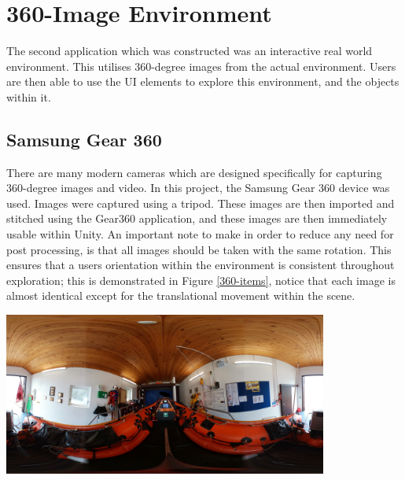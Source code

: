 \documentclass[ %
                    author={Elis Jones},
                supervisor={Dr. Kirsten Cater},
                    degree={BSc},
                     title={The Effect of Presentation Medium on Spatial Cognition},
                  subtitle={in the Virtual Environment},
                      year={2018} ]{dissertation}
\begin{document}
\section{360-Image Environment}
The second application which was constructed was an interactive real world environment. This utilises 360-degree images from the actual environment. Users are then able to use the UI elements to explore this environment, and the objects within it. 

\subsection{Samsung Gear 360}
There are many modern cameras which are designed specifically for capturing 360-degree images and video. In this project, the Samsung Gear 360 device was used. Images were captured using a tripod. These images are then imported and stitched using the Gear360 application, and these images are then immediately usable within Unity. An important note to make in order to reduce any need for post processing, is that all images should be taken with the same rotation. This ensures that a users orientation within the environment is consistent throughout exploration; this is demonstrated in Figure \ref{360-items}, notice that each image is almost identical except for the translational movement within the scene. 

\begin{minipage}{\textwidth}
\hfill \break
\centering
\includegraphics[width=0.8\textwidth]{images/centre}
\label{360-central}
\hfill \break
\end{minipage}
\end{document}
